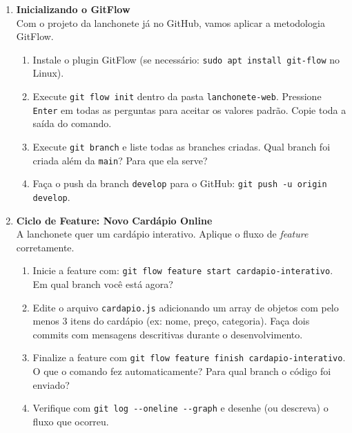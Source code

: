 \documentclass[12pt]{article}
\begin{document}
\begin{enumerate}[label=\textbf{Questão \arabic*:}, leftmargin=1.5cm, labelsep=0.5cm, resume]

    \item \textbf{Inicializando o GitFlow} \\
    Com o projeto da lanchonete já no GitHub, vamos aplicar a metodologia GitFlow.
    \begin{enumerate}[label=\alph*)]
        \item Instale o plugin GitFlow (se necessário: \texttt{sudo apt install git-flow} no Linux).
        \item Execute \texttt{git flow init} dentro da pasta \texttt{lanchonete-web}. Pressione \texttt{Enter} em todas as perguntas para aceitar os valores padrão. Copie toda a saída do comando.
        \item Execute \texttt{git branch} e liste todas as branches criadas. Qual branch foi criada além da \texttt{main}? Para que ela serve?
        \item Faça o push da branch \texttt{develop} para o GitHub: \texttt{git push -u origin develop}.
    \end{enumerate}

    \item \textbf{Ciclo de Feature: Novo Cardápio Online} \\
    A lanchonete quer um cardápio interativo. Aplique o fluxo de \textit{feature} corretamente.
    \begin{enumerate}[label=\alph*)]
        \item Inicie a feature com: \texttt{git flow feature start cardapio-interativo}. Em qual branch você está agora?
        \item Edite o arquivo \texttt{cardapio.js} adicionando um array de objetos com pelo menos 3 itens do cardápio (ex: nome, preço, categoria). Faça dois commits com mensagens descritivas durante o desenvolvimento.
        \item Finalize a feature com \texttt{git flow feature finish cardapio-interativo}. O que o comando fez automaticamente? Para qual branch o código foi enviado?
        \item Verifique com \texttt{git log -{-}oneline -{-}graph} e desenhe (ou descreva) o fluxo que ocorreu.
    \end{enumerate}


\end{enumerate}
\end{document}
